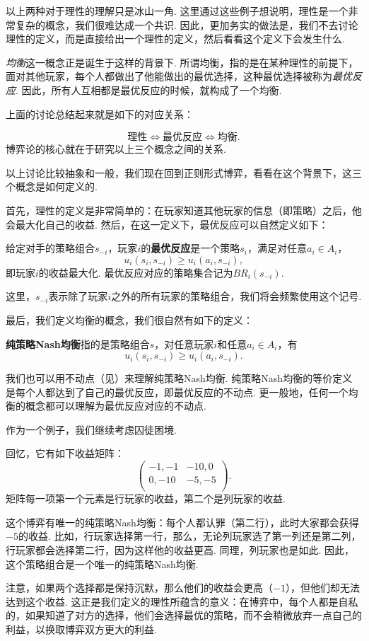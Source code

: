 以上两种对于理性的理解只是冰山一角. 这里通过这些例子想说明，理性是一个非常复杂的概念，我们很难达成一个共识. 因此，更加务实的做法是，我们不去讨论理性的定义，而是直接给出一个理性的定义，然后看看这个定义下会发生什么.

\textit{均衡}这一概念正是诞生于这样的背景下. 所谓均衡，指的是在某种理性的前提下，面对其他玩家，每个人都做出了他能做出的最优选择，这种最优选择被称为\textit{最优反应}. 因此，所有人互相都是最优反应的时候，就构成了一个均衡.

上面的讨论总结起来就是如下的对应关系：

\[
\text{理性}\iff\text{最优反应}\iff\text{均衡}.
\]
博弈论的核心就在于研究以上三个概念之间的关系.

以上讨论比较抽象和一般，我们现在回到正则形式博弈，看看在这个背景下，这三个概念是如何定义的.

首先，理性的定义是非常简单的：在玩家知道其他玩家的信息（即策略）之后，他会最大化自己的收益. 然后，在这一定义下，最优反应可以自然定义如下：

\begin{definition}[最优反应]
给定对手的策略组合$s_{-i}$，玩家$i$的\textbf{最优反应}是一个策略$s_i$，满足对任意$a_i\in A_i$，
    \[u_i(s_i,s_{-i})\geq u_i(a_i,s_{-i}),\]
即玩家$i$的收益最大化. 最优反应对应的策略集合记为$BR_i(s_{-i})$.
\end{definition}
这里，$s_{-i}$表示除了玩家$i$之外的所有玩家的策略组合，我们将会频繁使用这个记号.

最后，我们定义均衡的概念，我们很自然有如下的定义：

\begin{definition}[纯策略Nash均衡]
\textbf{纯策略Nash均衡}指的是策略组合$s$，对任意玩家$i$和任意$a_i\in A_i$，有
    \[u_i(s_i,s_{-i})\geq u_i(a_i,s_{-i}).\]
\end{definition}

我们也可以用不动点（见）来理解纯策略Nash均衡. 纯策略Nash均衡的等价定义是每个人都达到了自己的最优反应，即最优反应的不动点. 更一般地，任何一个均衡的概念都可以理解为最优反应对应的不动点.

作为一个例子，我们继续考虑囚徒困境.
\begin{example}[囚徒困境的纯策略Nash均衡]
回忆，它有如下收益矩阵：
\[
\begin{pmatrix}
-1,-1&-10,0\\
0,-10&-5,-5\\
\end{pmatrix}.
\]
矩阵每一项第一个元素是行玩家的收益，第二个是列玩家的收益. 

这个博弈有唯一的纯策略Nash均衡：每个人都认罪（第二行），此时大家都会获得$-5$的收益. 比如，行玩家选择第一行，那么，无论列玩家选了第一列还是第二列，行玩家都会选择第二行，因为这样他的收益更高. 同理，列玩家也是如此. 因此，这个策略组合是一个唯一的纯策略Nash均衡.

注意，如果两个选择都是保持沉默，那么他们的收益会更高（$-1$），但他们却无法达到这个收益. 这正是我们定义的理性所蕴含的意义：在博弈中，每个人都是自私的，如果知道了对方的选择，他们会选择最优的策略，而不会稍微放弃一点自己的利益，以换取博弈双方更大的利益.
\end{example}

